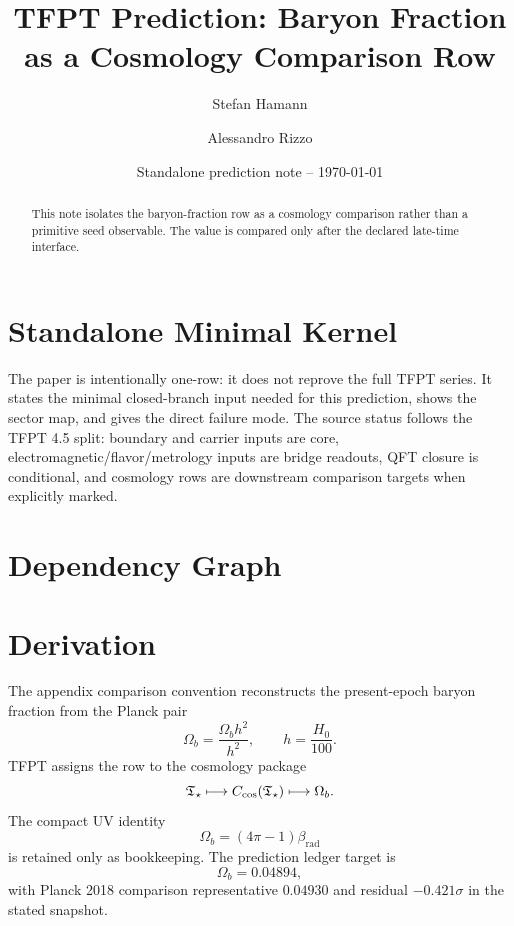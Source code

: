 \documentclass[11pt,a4paper]{article}
\title{\color{tfptblue}\textbf{TFPT Prediction: Baryon Fraction as a Cosmology Comparison Row}}
\author{Stefan Hamann \and Alessandro Rizzo}
\date{{\normalsize\color{tfptgray}\sffamily Standalone prediction note -- \today}}
\begin{document}
\maketitle

\begin{abstract}
This note isolates the baryon-fraction row as a cosmology comparison rather than a primitive seed observable. The value is compared only after the declared late-time interface.
\end{abstract}



\section{Standalone Minimal Kernel}
\MinimalKernelBox

The paper is intentionally one-row: it does not reprove the full TFPT series. It states the minimal closed-branch input needed for this prediction, shows the sector map, and gives the direct failure mode. The source status follows the TFPT 4.5 split: boundary and carrier inputs are core, electromagnetic/flavor/metrology inputs are bridge readouts, QFT closure is conditional, and cosmology rows are downstream comparison targets when explicitly marked.


\section{Dependency Graph}

\section{Derivation}

The appendix comparison convention reconstructs the present-epoch baryon fraction from the Planck pair
\[
\Omega_b=\frac{\Omega_b h^2}{h^2},
\qquad
h=\frac{H_0}{100}.
\]
TFPT assigns the row to the cosmology package
\[
\mathfrak T_{\star}\longmapsto C_{\mathrm{cos}}(\mathfrak T_{\star})\longmapsto \Omega_b.
\]
The compact UV identity
\[
\Omega_b=(4\pi-1)\beta_{\mathrm{rad}}
\]
is retained only as bookkeeping. The prediction ledger target is
\[
\Omega_b=0.04894,
\]
with Planck 2018 comparison representative $0.04930$ and residual $-0.421\sigma$ in the stated snapshot.
\end{document}
